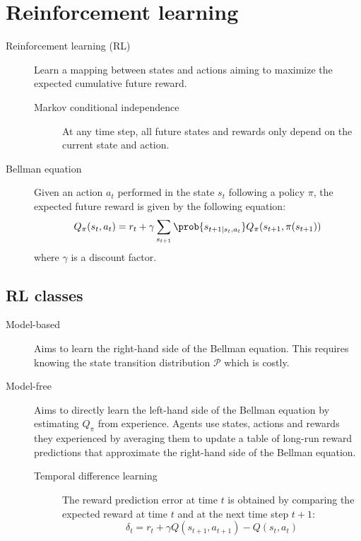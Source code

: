 \section{Reinforcement learning}

\begin{description}
    \item[Reinforcement learning (RL)] 
        Learn a mapping between states and actions aiming to maximize the expected cumulative future reward.

        \begin{description}
            \item[Markov conditional independence] At any time step, all future states and rewards only depend on the current state and action. 
        \end{description}


    \item[Bellman equation] 
        Given an action $a_t$ performed in the state $s_t$ following a policy $\pi$,
        the expected future reward is given by the following equation:
        \[ Q_\pi(s_t, a_t) = r_t + \gamma \sum_{s_{t+1}} \prob{s_{t+1 | s_t, a_t}} Q_\pi(s_{t+1}, \pi(s_{t+1})) \]
        where $\gamma$ is a discount factor.
\end{description}


\subsection{RL classes}

\begin{description}
    \item[Model-based] 
        Aims to learn the right-hand side of the Bellman equation.
        This requires knowing the state transition distribution $\mathcal{P}$ which is costly.

    \item[Model-free] 
        Aims to directly learn the left-hand side of the Bellman equation by estimating $Q_\pi$ from experience.
        Agents use states, actions and rewards they experienced by averaging them to update a table of long-run reward predictions that
        approximate the right-hand side of the Bellman equation.

        \begin{description}
            \item[Temporal difference learning] 
                The reward prediction error at time $t$ is obtained by comparing the expected reward at time $t$ and at the next time step $t+1$:
                \[ \delta_t = r_t + \gamma Q(s_{t+1}, a_{t+1}) - Q(s_t, a_t) \]
        \end{description}
\end{description}

